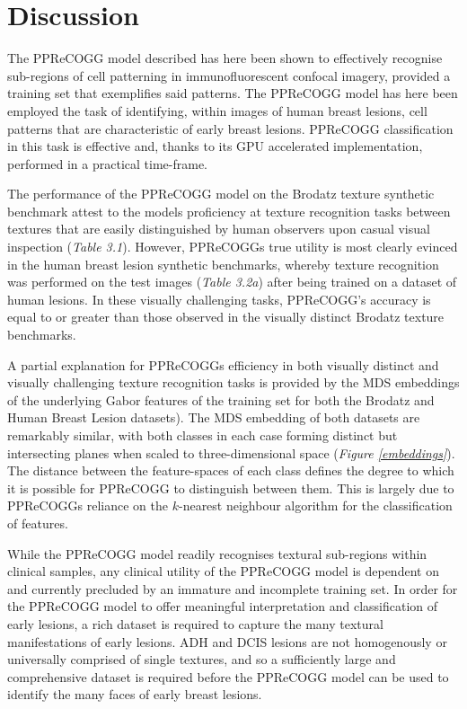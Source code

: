 \section{Discussion}

The PPReCOGG model described has here been shown to effectively recognise sub-regions of cell patterning in immunofluorescent confocal imagery, provided a training set that exemplifies said patterns. The PPReCOGG model has here been employed the task of identifying, within images of human breast lesions, cell patterns that are characteristic of early breast lesions. PPReCOGG classification in this task is effective and, thanks to its GPU accelerated implementation, performed in a practical time-frame.\par

The performance of the PPReCOGG model on the Brodatz texture synthetic benchmark attest to the models proficiency at texture recognition tasks between textures that are easily distinguished by human observers upon casual visual inspection (\textit{Table 3.1}). However, PPReCOGGs true utility is most clearly evinced in the human breast lesion synthetic benchmarks, whereby texture recognition was performed on the test images (\textit{Table 3.2a}) after being trained on a dataset of human lesions. In these visually challenging tasks, PPReCOGG's accuracy is equal to or greater than those observed in the visually distinct Brodatz texture benchmarks.\par 

A partial explanation for PPReCOGGs efficiency in both visually distinct and visually challenging texture recognition tasks is provided by the MDS embeddings of the underlying Gabor features of the training set for both the Brodatz and Human Breast Lesion datasets). The MDS embedding of both datasets are remarkably similar, with both classes in each case forming distinct but intersecting planes when scaled to three-dimensional space (\textit{Figure \ref{embeddings}}). The distance between the feature-spaces of each class defines the degree to which it is possible for PPReCOGG to distinguish between them. This is largely due to PPReCOGGs reliance on the $k$-nearest neighbour algorithm for the classification of features.\par

While the PPReCOGG model readily recognises textural sub-regions within clinical samples, any clinical utility of the PPReCOGG model is dependent on and currently precluded by an immature and incomplete training set. In order for the PPReCOGG model to offer meaningful interpretation and classification of early lesions, a rich dataset is required to capture the many textural manifestations of early lesions. ADH and DCIS lesions are not homogenously or universally comprised of single textures, and so a sufficiently large and comprehensive dataset is required before the PPReCOGG model can be used to identify the many faces of early breast lesions. \par

